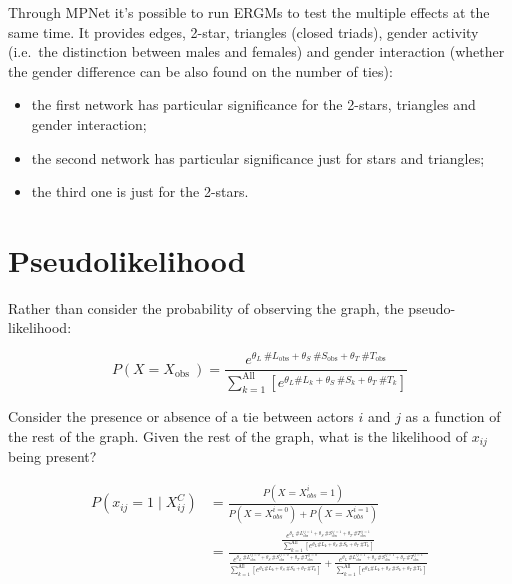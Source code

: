\documentclass[
  notitlepage,
  onecolumn,
  openany]{book}
\providecommand{\tightlist}{%
  \setlength{\itemsep}{0pt}\setlength{\parskip}{0pt}}
\begin{document}
Through MPNet it's possible to run ERGMs to test the multiple effects at the same time. It provides edges, 2-star, triangles (closed triads), gender activity (i.e.~the distinction between males and females) and gender interaction (whether the gender difference can be also found on the number of ties):

\begin{itemize}
\tightlist
\item
  the first network has particular significance for the 2-stars, triangles and gender interaction;
\item
  the second network has particular significance just for stars and triangles;
\item
  the third one is just for the 2-stars.
\end{itemize}

\hypertarget{pseudolikelihood}{%
\section{Pseudolikelihood}\label{pseudolikelihood}}

Rather than consider the probability of observing the graph, the pseudo-likelihood:

\[
P\left(X=X_{\text {obs }}\right) = \frac{e^{\theta_{L}\ \# L_{\text {obs}}+\theta_{S} \ \# S_{\text {obs}}+\theta_{T}\ \# T_{\text {obs}}}}{\sum_{k=1}^{\text {All }}[e^{\theta_{L} \#L_{k}+\theta_{S} \ \# S_{k}+\theta_{T} \ \#T_{k}}]}
\]

Consider the presence or absence of a tie between actors \(i\) and \(j\) as a function of the rest of the graph. Given the rest of the graph, what is the likelihood of \(x_{ij}\) being present?

\[
\begin{aligned}
P(x_{ij} =1 \mid X_{ij}^{C}) &=\frac{P\left(X=X_{obs}^{i}=1\right)}{{P}\left({X}={X}_{{obs}}^{{i}=0}\right)+{P}\left({X}={X}_{{obs}}^{{i}=1}\right)}\\
&= \frac{\frac{e^{\theta_{L}\ \# L_{\text {obs}}^{ij=1}+\theta_{S} \ \# S_{\text {obs}}^{ij=1}+\theta_{T}\ \# T_{\text {obs}}^{ij=1}}}{\sum_{k=1}^{\text {All }}[e^{\theta_{L} \#L_{k}+\theta_{S} \ \# S_{k}+\theta_{T} \ \#T_{k}}]}}{\frac{e^{\theta_{L}\ \# L_{\text {obs}}^{ij=0}+\theta_{S} \ \# S_{\text {obs}}^{ij=0}+\theta_{T}\ \# T_{\text {obs}}^{ij=0}}}{\sum_{k=1}^{\text {All }}[e^{\theta_{L} \#L_{k}+\theta_{S} \ \# S_{k}+\theta_{T} \ \#T_{k}}]}+\frac{e^{\theta_{L}\ \# L_{\text {obs}}^{ij=1}+\theta_{S} \ \# S_{\text {obs}}^{ij=1}+\theta_{T}\ \# T_{\text {obs}}^{ij=1}}}{\sum_{k=1}^{\text {All }}[e^{\theta_{L} \#L_{k}+\theta_{S} \ \# S_{k}+\theta_{T} \ \#T_{k}}]}}
\end{aligned}
\]
\end{document}
